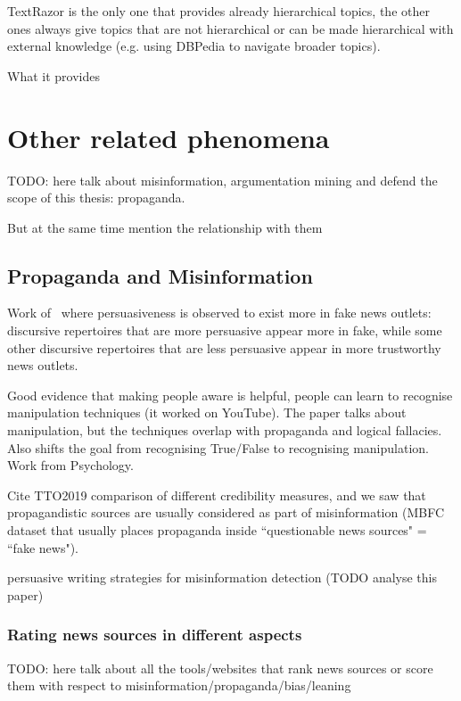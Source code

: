 TextRazor is the only one that provides already hierarchical topics, the other ones always give topics that are not hierarchical or can be made hierarchical with external knowledge (e.g. using DBPedia to navigate broader topics).

What it provides


\section{Other related phenomena}
\label{sec:lit_related}

TODO: here talk about misinformation, argumentation mining and defend the scope of this thesis: propaganda.

But at the same time mention the relationship with them

\subsection{Propaganda and Misinformation}
\label{sec:lit_related_misinformation}

Work of~\citet{orrumachine} where persuasiveness is observed to exist more in fake news outlets: discursive repertoires that are more persuasive appear more in fake, while some other discursive repertoires that are less persuasive appear in more trustworthy news outlets.




\cite{roozenbeek2022countering} Good evidence that making people aware is helpful, people can learn to recognise manipulation techniques (it worked on YouTube). The paper talks about manipulation, but the techniques overlap with propaganda and logical fallacies. Also shifts the goal from recognising True/False to recognising manipulation. Work from Psychology.

Cite TTO2019 comparison of different credibility measures, and we saw that propagandistic sources are usually considered as part of misinformation (MBFC dataset that usually places propaganda inside ``questionable news sources" = ``fake news").


\cite{romain2022misinformation} persuasive writing strategies for misinformation detection (TODO analyse this paper)

\subsubsection{Rating news sources in different aspects}

TODO: here talk about all the tools/websites that rank news sources or score them with respect to misinformation/propaganda/bias/leaning

